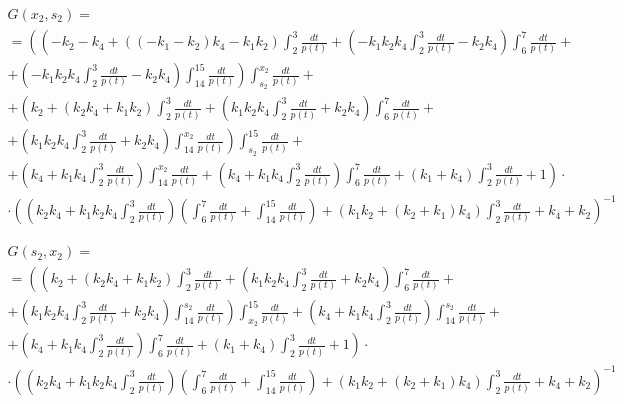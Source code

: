 \documentclass[a4paper,12pt]{article} %
\begin{document}
\begin{multline}
	G(x_2,s_2)=\\=
	\left(
		\left(
			-k_2-k_4+\left( \left( -k_1-k_2\right)  k_4-k_1 k_2\right)  \int_{2}^{3}\frac{dt}{p(t)}+\left( -k_1 k_2 k_4 \int_{2}^{3}\frac{dt}{p(t)}-k_2 k_4\right)  \int_{6}^{7}\frac{dt}{p(t)}
			\right. \right. + \\ + \left. \left.
			\left( -k_1 k_2 k_4 \int_{2}^{3}\frac{dt}{p(t)}-k_2 k_4\right)  \int_{14}^{15}\frac{dt}{p(t)}
		\right)
		\int_{s_2}^{x_2}\frac{dt}{p(t)}
		\right. + \\ + \left.
		\left( k_2+\left( k_2 k_4+k_1 k_2\right)  \int_{2}^{3}\frac{dt}{p(t)}+\left( k_1 k_2 k_4 \int_{2}^{3}\frac{dt}{p(t)}
		+%
		k_2 k_4\right)  \int_{6}^{7}\frac{dt}{p(t)}
		\right. \right. + \\ + \left. \left.
		\left( k_1 k_2 k_4 \int_{2}^{3}\frac{dt}{p(t)}+k_2 k_4\right)  \int_{14}^{x_2}\frac{dt}{p(t)}\right)  \int_{s_2}^{15}\frac{dt}{p(t)}
		\right. + \\ + \left.
		\left( k_4+k_1 k_4 \int_{2}^{3}\frac{dt}{p(t)}\right)  \int_{14}^{x_2}\frac{dt}{p(t)}+\left( k_4+k_1 k_4 \int_{2}^{3}\frac{dt}{p(t)}\right)  \int_{6}^{7}\frac{dt}{p(t)}+\left( k_1+k_4\right)  \int_{2}^{3}\frac{dt}{p(t)}+1
	\right) \cdot \\ \cdot \left(
		\left( k_2 k_4+k_1 k_2 k_4 \int_{2}^{3}\frac{dt}{p(t)}\right)
		\left( \int_{6}^{7}\frac{dt}{p(t)}+ \int_{14}^{15}\frac{dt}{p(t)} \right)+
		\left( k_1 k_2+\left( k_2+k_1\right)  k_4\right)  \int_{2}^{3}\frac{dt}{p(t)}+k_4+k_2
	\right)^{-1}
\end{multline}


\begin{multline}
	G(s_2,x_2)=\\=
	\left(
		\left( k_2+\left( k_2 k_4+k_1 k_2\right)  \int_{2}^{3}\frac{dt}{p(t)}+
		\left( k_1 k_2 k_4 \int_{2}^{3}\frac{dt}{p(t)}+k_2 k_4\right)  \int_{6}^{7}\frac{dt}{p(t)}
		\right. \right. + \\ + \left. \left.
		\left( k_1 k_2 k_4 \int_{2}^{3}\frac{dt}{p(t)}
		+%
		k_2 k_4\right)  \int_{14}^{s_2}\frac{dt}{p(t)}\right)  \int_{x_2}^{15}\frac{dt}{p(t)}+
		\left( k_4+k_1 k_4 \int_{2}^{3}\frac{dt}{p(t)}\right)  \int_{14}^{s_2}\frac{dt}{p(t)}
		\right. + \\ + \left.
		\left( k_4+k_1 k_4 \int_{2}^{3}\frac{dt}{p(t)}\right)  \int_{6}^{7}\frac{dt}{p(t)}+\left( k_1+k_4\right)  \int_{2}^{3}\frac{dt}{p(t)}+1
	\right) \cdot \\ \cdot \left(
		\left( k_2 k_4+k_1 k_2 k_4 \int_{2}^{3}\frac{dt}{p(t)}\right)
		\left( \int_{6}^{7}\frac{dt}{p(t)}+ \int_{14}^{15}\frac{dt}{p(t)} \right)+
		\left( k_1 k_2+\left( k_2+k_1\right)  k_4\right)  \int_{2}^{3}\frac{dt}{p(t)}+k_4+k_2
	\right)^{-1}
\end{multline}
\end{document}
